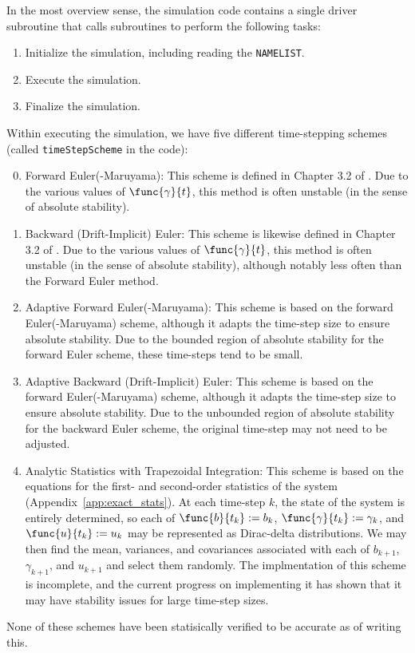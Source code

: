 In the most overview sense, the simulation code contains a single driver subroutine that calls subroutines to perform the following tasks:
\begin{enumerate}[1.]
	\item Initialize the simulation, including reading the \texttt{NAMELIST}.
	\item Execute the simulation.
	\item Finalize the simulation.
\end{enumerate}
Within executing the simulation, we have five different time-stepping schemes (called \texttt{timeStepScheme} in the code):
\begin{enumerate}[(1)]
	\setcounter{enumi}{-1}
	\item Forward Euler(-Maruyama): This scheme is defined in Chapter 3.2 of \cite{Zhang17}. Due to the various values of $\func{\gamma}{t}$, this method is often unstable (in the sense of absolute stability).
	\item Backward (Drift-Implicit) Euler: This scheme is likewise defined in Chapter 3.2 of \cite{Zhang17}. Due to the various values of $\func{\gamma}{t}$, this method is often unstable (in the sense of absolute stability), although notably less often than the Forward Euler method.
	\item Adaptive Forward Euler(-Maruyama): This scheme is based on the forward Euler(-Maruyama) scheme, although it adapts the time-step size to ensure absolute stability. Due to the bounded region of absolute stability for the forward Euler scheme, these time-steps tend to be small.
	\item Adaptive Backward (Drift-Implicit) Euler: This scheme is based on the forward Euler(-Maruyama) scheme, although it adapts the time-step size to ensure absolute stability. Due to the unbounded region of absolute stability for the backward Euler scheme, the original time-step may not need to be adjusted.
	\item Analytic Statistics with Trapezoidal Integration: This scheme is based on the equations for the first- and second-order statistics of the system (Appendix~\ref{app:exact_stats}). At each time-step $k$, the state of the system is entirely determined, so each of $\func{b}{t_k} := b_k$, $\func{\gamma}{t_k} := \gamma_k$, and $\func{u}{t_k} := u_k$ may be represented as Dirac-delta distributions. We may then find the mean, variances, and covariances associated with each of $b_{k+1}$, $\gamma_{k+1}$, and $u_{k+1}$ and select them randomly. The implmentation of this scheme is incomplete, and the current progress on implementing it has shown that it may have stability issues for large time-step sizes.
\end{enumerate}

None of these schemes have been statisically verified to be accurate as of writing this.
